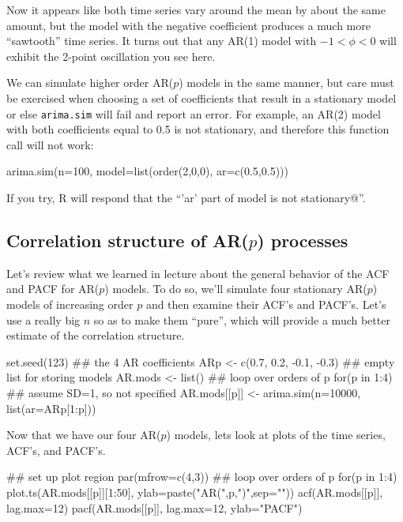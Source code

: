 \noindent Now it appears like both time series vary around the mean by about the same amount, but the model with the negative coefficient produces a much more ``sawtooth'' time series.  It turns out that any AR(1) model with $-1<\phi<0$ will exhibit the 2-point oscillation you see here.

We can simulate higher order AR($p$) models in the same manner, but care must be exercised when choosing a set of coefficients that result in a stationary model or else \texttt{arima.sim} will fail and report an error.  For example, an AR(2) model with both coefficients equal to 0.5 is not stationary, and therefore this function call will not work:

\begin{Schunk}
\begin{Sinput}
 arima.sim(n=100, model=list(order(2,0,0), ar=c(0.5,0.5)))
\end{Sinput}
\end{Schunk}
\noindent If you try, R will respond that the ``\verb@'ar' part of model is not stationary@''.

\subsection{Correlation structure of AR($p$) processes}

Let's review what we learned in lecture about the general behavior of the ACF and PACF for AR($p$) models.  To do so, we'll simulate four stationary AR($p$) models of increasing order $p$ and then examine their ACF's and PACF's.  Let's use a really big $n$ so as to make them ``pure'', which will provide a much better estimate of the correlation structure.

\begin{Schunk}
\begin{Sinput}
 set.seed(123)
 ## the 4 AR coefficients
 ARp <- c(0.7, 0.2, -0.1, -0.3)
 ## empty list for storing models
 AR.mods <- list()
 ## loop over orders of p
 for(p in 1:4) {
   ## assume SD=1, so not specified
   AR.mods[[p]] <- arima.sim(n=10000, list(ar=ARp[1:p]))
 }
\end{Sinput}
\end{Schunk}

Now that we have our four AR($p$) models, lets look at plots of the time series, ACF's, and PACF's.

\begin{Schunk}
\begin{Sinput}
 ## set up plot region
 par(mfrow=c(4,3))
 ## loop over orders of p
 for(p in 1:4) {
   plot.ts(AR.mods[[p]][1:50],
           ylab=paste("AR(",p,")",sep=""))
   acf(AR.mods[[p]], lag.max=12)
   pacf(AR.mods[[p]], lag.max=12, ylab="PACF")
 }
\end{Sinput}
\end{Schunk}

